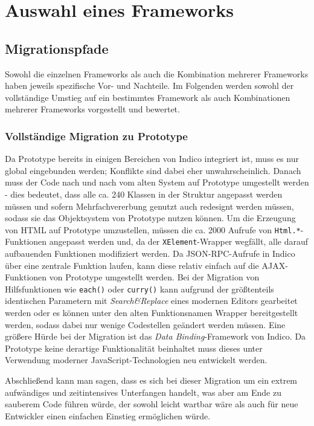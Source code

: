 \chapter{Auswahl eines Frameworks}

\section{Migrationspfade}
Sowohl die einzelnen Frameworks als auch die Kombination mehrerer Frameworks haben jeweils
spezifische Vor- und Nachteile. Im Folgenden werden sowohl der vollständige Umstieg auf ein
bestimmtes Framework als auch Kombinationen mehrerer Frameworks vorgestellt und bewertet.

\subsection{Vollständige Migration zu Prototype}
Da Prototype bereits in einigen Bereichen von Indico integriert ist, muss es nur global
eingebunden werden; Konflikte sind dabei eher unwahrscheinlich. Danach muss der Code nach und nach
vom alten System auf Prototype umgestellt werden - dies bedeutet, dass alle ca. 240 Klassen in der
Struktur angepasst werden müssen und sofern Mehrfachvererbung genutzt auch redesignt werden müssen,
sodass sie das Objektsystem von Prototype nutzen können. Um die Erzeugung von HTML auf Prototype
umzustellen, müssen die ca. 2000 Aufrufe von \lstinline{Html.*}-Funktionen angepasst werden und, da
der \lstinline{XElement}-Wrapper wegfällt, alle darauf aufbauenden Funktionen modifiziert werden. Da
JSON-RPC-Aufrufe in Indico über eine zentrale Funktion laufen, kann diese relativ einfach auf die
AJAX-Funktionen von Prototype umgestellt werden. Bei der Migration von Hilfsfunktionen wie
\lstinline{each()} oder \lstinline{curry()} kann aufgrund der größtenteils identischen Parametern
mit \emph{Search\&Replace} eines modernen Editors gearbeitet werden oder es können unter den alten
Funktionsnamen Wrapper bereitgestellt werden, sodass dabei nur wenige Codestellen geändert werden
müssen. Eine größere Hürde bei der Migration ist das \emph{Data Binding}-Framework von Indico. Da
Prototype keine derartige Funktionalität beinhaltet muss dieses unter Verwendung moderner
JavaScript-Technologien neu entwickelt werden.

Abschließend kann man sagen, dass es sich bei dieser Migration um ein extrem aufwändiges und
zeitintensives Unterfangen handelt, was aber am Ende zu sauberem Code führen würde, der sowohl
leicht wartbar wäre als auch für neue Entwickler einen einfachen Einstieg ermöglichen würde.


